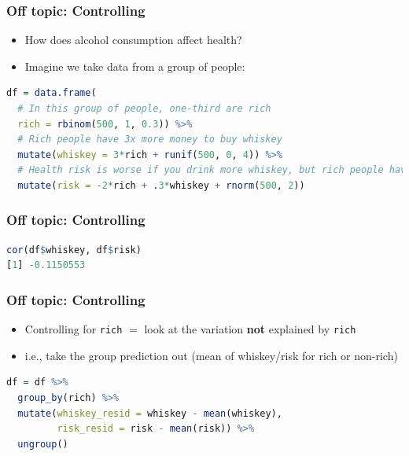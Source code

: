 \documentclass[aspectratio=43]{beamer}
\begin{document}
\begin{frame}[fragile]
\frametitle{Off topic: Controlling}
\centering

\begin{itemize}
  \item How does alcohol consumption affect health?
  \item Imagine we take data from a group of people:
\end{itemize}

 \begin{lstlisting}[language=R]
df = data.frame(
  # In this group of people, one-third are rich
  rich = rbinom(500, 1, 0.3)) %>%
  # Rich people have 3x more money to buy whiskey
  mutate(whiskey = 3*rich + runif(500, 0, 4)) %>%
  # Health risk is worse if you drink more whiskey, but rich people have better health overall
  mutate(risk = -2*rich + .3*whiskey + rnorm(500, 2))
 \end{lstlisting}

\end{frame}

\begin{frame}[fragile]
\frametitle{Off topic: Controlling}
\centering

\begin{lstlisting}[language=R]
cor(df$whiskey, df$risk)
[1] -0.1150553
\end{lstlisting}

\end{frame}

\begin{frame}[fragile]
\frametitle{Off topic: Controlling}
\centering

\begin{itemize}
  \item Controlling for \texttt{rich} $=$ look at the variation \textbf{not} explained by \texttt{rich}
  \item i.e., take the group prediction out (mean of whiskey/risk for rich or non-rich)
\end{itemize}

\begin{lstlisting}[language=R]
df = df %>%
  group_by(rich) %>%
  mutate(whiskey_resid = whiskey - mean(whiskey),
         risk_resid = risk - mean(risk)) %>%
  ungroup()
\end{lstlisting}

\end{frame}
\end{document}
